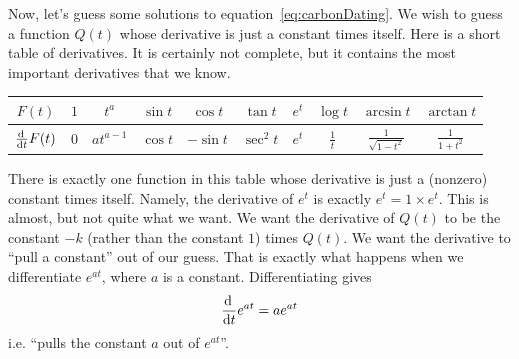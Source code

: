 Now, let's guess some solutions to equation~\eqref{eq:carbonDating}. We
wish to guess a function $Q(t)$ whose derivative is just a constant times
itself. Here is a short table of derivatives. It is certainly not complete,
but it contains the most important derivatives that we know.
\renewcommand{\arraystretch}{1.3}
\begin{center}
     \begin{tabular}{|c||c|c|c|c|c|c|c|c|c|}
          \hline
                  $F(t)$ &           $1$ &  $t^a$ &     $\sin t$ & $\cos t$
                  & $\tan t$ & $e^t$ & $\log t$
                  & $\arcsin t$ & $\arctan t$
           \\ \hline
                  $\diff{}{t}F(t)$ & $0$ & $at^{a-1}$ & $\cos t$ & $-\sin t$
                  &  $\sec^2 t$ & $e^t$ & $\frac{1}{t}$
                  & $\frac{1}{\sqrt{1-t^2}}$ & $\frac{1}{1+t^2}$
           \\ \hline
     \end{tabular}
\end{center}
\renewcommand{\arraystretch}{1.0}
There is exactly one function in this table whose derivative is just a
(nonzero) constant times itself. Namely, the derivative of $e^t$ is exactly
$e^t = 1\times e^t$. This is almost, but not quite what we want. We want
the derivative of $Q(t)$ to be the constant $-k$ (rather than the constant
$1$) times $Q(t)$. We want the derivative to ``pull a constant'' out of
our guess. That is exactly what happens when we differentiate $e^{at}$,
where $a$ is a constant. Differentiating gives
\begin{align*}
\diff{}{t}e^{at} = a e^{at}
\end{align*}
i.e. ``pulls the constant $a$ out of $e^{at}$''.


